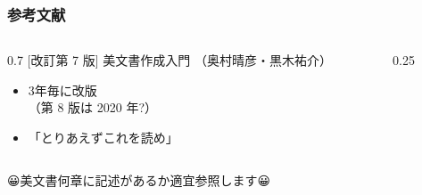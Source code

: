\begin{frame}
	\frametitle{参考文献}
	\begin{columns}[c]
		\begin{column}{0.7\textwidth}
			[改訂第 7 版] \LaTeXe 美文書作成入門 （奥村晴彦・黒木祐介）

			\begin{itemize}
				\item 3年毎に改版\\（第 8 版は 2020 年?）
				\item 「とりあえずこれを読め」
			\end{itemize}

		\end{column}
		\begin{column}{0.25\textwidth}
		\end{column}
	\end{columns}
	{\nishikifont 😀美文書何章に記述があるか適宜参照します😀}
\end{frame}

